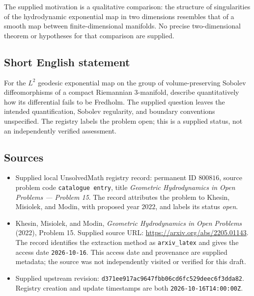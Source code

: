 \documentclass[11pt]{article}
\begin{document}
The supplied motivation is a qualitative comparison: the structure of singularities of the hydrodynamic exponential map in two dimensions resembles that of a smooth map between finite-dimensional manifolds. No precise two-dimensional theorem or hypotheses for that comparison are supplied.
\subsection{Short English statement}
For the \(L^2\) geodesic exponential map on the group of volume-preserving Sobolev diffeomorphisms of a compact Riemannian \(3\)-manifold, describe quantitatively how its differential fails to be Fredholm. The supplied question leaves the intended quantification, Sobolev regularity, and boundary conventions unspecified. The registry labels the problem open; this is a supplied status, not an independently verified assessment.
\subsection{Sources}
\begin{itemize}
\item Supplied local UnsolvedMath registry record: permanent ID \(800816\), source problem code \texttt{catalogue entry}, title \emph{Geometric Hydrodynamics in Open Problems --- Problem 15}. The record attributes the problem to Khesin, Misiolek, and Modin, with proposed year \(2022\), and labels its status \emph{open}.
\item Khesin, Misiolek, and Modin, \emph{Geometric Hydrodynamics in Open Problems} (2022), Problem 15. Supplied source URL: \url{https://arxiv.org/abs/2205.01143}. The record identifies the extraction method as \texttt{arxiv\_latex} and gives the access date \texttt{2026-10-16}. This access date and provenance are supplied metadata; the source was not independently visited or verified for this draft.
\item Supplied upstream revision: \texttt{d371ee917ac9647fbb06cd6fc529deec6f3dda82}. Registry creation and update timestamps are both \texttt{2026-10-16T14:00:00Z}.
\end{itemize}
\end{document}
